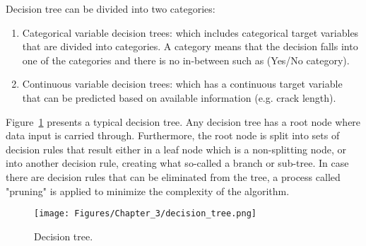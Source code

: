 Decision tree can be divided into two categories:
\begin{enumerate}
	\item Categorical variable decision trees: which includes categorical target variables that are divided into categories. A category means that the decision falls into one of the categories and there is no in-between such as (Yes/No category).
	\item Continuous variable decision trees: which has a continuous target variable that can be predicted based on available information (e.g. crack length).
\end{enumerate}
Figure~\ref{fig:Decision_tree} presents a typical decision tree.
Any decision tree has a root node where data input is carried through.
Furthermore, the root node is split into sets of decision rules that result either in a leaf node which is a non-splitting node, or into another decision rule, creating what so-called a branch or sub-tree.
In case there are decision rules that can be eliminated from the tree, a process called "pruning" is applied to minimize the complexity of the algorithm.
\begin{figure}[!ht]
	\begin{center}
		\texttt{[image: Figures/Chapter\_3/decision\_tree.png]}
	\end{center}
	\caption{Decision tree.}
	\label{fig:Decision_tree}
\end{figure} 